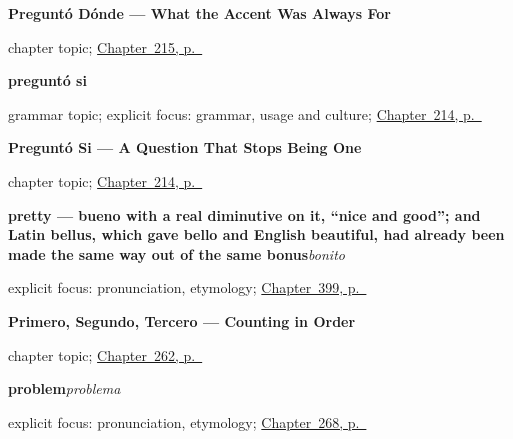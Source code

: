 \noindent\begin{minipage}[t]{\linewidth}
\raggedright
\textbf{Preguntó Dónde --- What the Accent Was Always For}\par
\footnotesize chapter topic; \hyperref[ch:pregunto-donde]{Chapter~215, p.~\pageref*{ch:pregunto-donde}}
\end{minipage}\par\smallskip

\noindent\begin{minipage}[t]{\linewidth}
\raggedright
\textbf{preguntó si}\par
\footnotesize grammar topic; explicit focus: grammar, usage and culture; \hyperref[ch:pregunto-si]{Chapter~214, p.~\pageref*{ch:pregunto-si}}
\end{minipage}\par\smallskip

\noindent\begin{minipage}[t]{\linewidth}
\raggedright
\textbf{Preguntó Si --- A Question That Stops Being One}\par
\footnotesize chapter topic; \hyperref[ch:pregunto-si]{Chapter~214, p.~\pageref*{ch:pregunto-si}}
\end{minipage}\par\smallskip

\noindent\begin{minipage}[t]{\linewidth}
\raggedright
\textbf{pretty — bueno with a real diminutive on it, \textquotedblleft{}nice and good\textquotedblright{}; and Latin bellus, which gave bello and English beautiful, had already been made the same way out of the same bonus}\enspace\emph{bonito}\par
\footnotesize explicit focus: pronunciation, etymology; \hyperref[ch:bonito-y-guapo]{Chapter~399, p.~\pageref*{ch:bonito-y-guapo}}
\end{minipage}\par\smallskip

\noindent\begin{minipage}[t]{\linewidth}
\raggedright
\textbf{Primero, Segundo, Tercero --- Counting in Order}\par
\footnotesize chapter topic; \hyperref[ch:primero]{Chapter~262, p.~\pageref*{ch:primero}}
\end{minipage}\par\smallskip

\noindent\begin{minipage}[t]{\linewidth}
\raggedright
\textbf{problem}\enspace\emph{problema}\par
\footnotesize explicit focus: pronunciation, etymology; \hyperref[ch:viajar]{Chapter~268, p.~\pageref*{ch:viajar}}
\end{minipage}\par\smallskip

